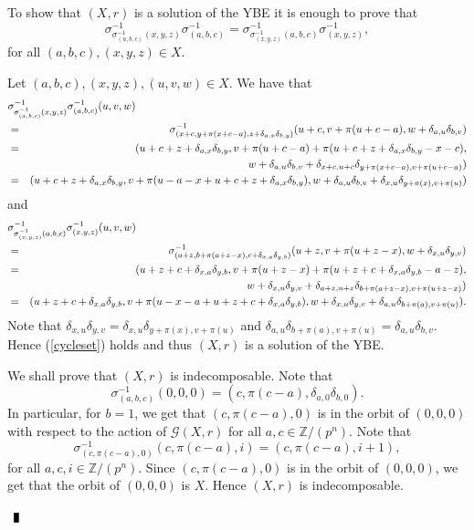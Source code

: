 \documentclass[10pt]{article}
\newcommand{\Z}{\mathbb{Z}}
\newenvironment{proof}{\par\noindent{ Proof.}}{$\qed$\par\bigskip}
\newcommand{\qed}{\enspace\vrule  height6pt  width4pt  depth2pt}
\begin{document}
\begin{proof}
To show that $(X,r)$ is a solution of the YBE it is enough to prove that
\begin{equation}\label{cycleset}
    \sigma^{-1}_{\sigma^{-1}_{(a,b,c)}(x,y,z)}\sigma^{-1}_{(a,b,c)}
    =\sigma^{-1}_{\sigma^{-1}_{(x,y,z)}(a,b,c)}\sigma^{-1}_{(x,y,z)},
    \end{equation}
    for all $(a,b,c),(x,y,z)\in X$.

Let $(a,b,c),(x,y,z),(u,v,w)\in X$. We have that
\begin{eqnarray*}
    \lefteqn{\sigma^{-1}_{\sigma^{-1}_{(a,b,c)}(x,y,z)}\sigma^{-1}_{(a,b,c)}(u,v,w)}\\
    &=&\sigma^{-1}_{(x+c, y+\pi(x+c-a), z+\delta_{a,x}\delta_{b,y})}(u+c, v+\pi(u+c-a), w+\delta_{a,u}\delta_{b,v})\\
    &=&(u+c+z+\delta_{a,x}\delta_{b,y}, v+\pi(u+c-a)+\pi(u+c+z+\delta_{a,x}\delta_{b,y}-x-c),\\
    &&\qquad w+\delta_{a,u}\delta_{b,v}+\delta_{x+c,u+c}\delta_{y+\pi(x+c-a),v+\pi(u+c-a)})\\
    &=&(u+c+z+\delta_{a,x}\delta_{b,y}, v+\pi(u-a-x+u+c+z+\delta_{a,x}\delta_{b,y}),
    w+\delta_{a,u}\delta_{b,v}+\delta_{x,u}\delta_{y+\pi(x),v+\pi(u)})
    \end{eqnarray*}
and
\begin{eqnarray*}
    \lefteqn{\sigma^{-1}_{\sigma^{-1}_{(x,y,z)}(a,b,c)}\sigma^{-1}_{(x,y,z)}(u,v,w)}\\
    &=&\sigma^{-1}_{(a+z, b+\pi(a+z-x), c+\delta_{x,a}\delta_{y,b})}(u+z, v+\pi(u+z-x), w+\delta_{x,u}\delta_{y,v})\\
    &=&(u+z+c+\delta_{x,a}\delta_{y,b}, v+\pi(u+z-x)+\pi(u+z+c+\delta_{x,a}\delta_{y,b}-a-z),\\
    &&\qquad w+\delta_{x,u}\delta_{y,v}+\delta_{a+z,u+z}\delta_{b+\pi(a+z-x),v+\pi(u+z-x)})\\
    &=&(u+z+c+\delta_{x,a}\delta_{y,b}, v+\pi(u-x-a+u+z+c+\delta_{x,a}\delta_{y,b}),
    w+\delta_{x,u}\delta_{y,v}+\delta_{a,u}\delta_{b+\pi(a),v+\pi(u)}).
\end{eqnarray*}
Note that $\delta_{x,u}\delta_{y,v}=\delta_{x,u}\delta_{y+\pi(x),v+\pi(u)}$
and $\delta_{a,u}\delta_{b+\pi(a),v+\pi(u)}=\delta_{a,u}\delta_{b,v}$. Hence
(\ref{cycleset}) holds and thus $(X,r)$ is a solution of the YBE.

We shall prove that $(X,r)$ is indecomposable. Note that
$$\sigma^{-1}_{(a,b,c)}(0,0,0)=(c, \pi(c-a), \delta_{a,0}\delta_{b,0}).$$
In particular, for $b=1$, we get that $(c,\pi(c-a),0)$ is in the
orbit of $(0,0,0)$ with respect to the action of
$\mathcal{G}(X,r)$ for all $a,c\in\Z/(p^n)$. Note that
$$\sigma^{-1}_{(c,\pi(c-a),0)}(c,\pi(c-a),i)=(c, \pi(c-a),i+1),$$
for all $a,c,i\in\Z/(p^n)$. Since $(c,\pi(c-a),0)$ is in the orbit of
$(0,0,0)$, we get that the orbit of $(0,0,0)$ is $X$. Hence
$(X,r)$ is indecomposable.


\end{proof}
\end{document}
